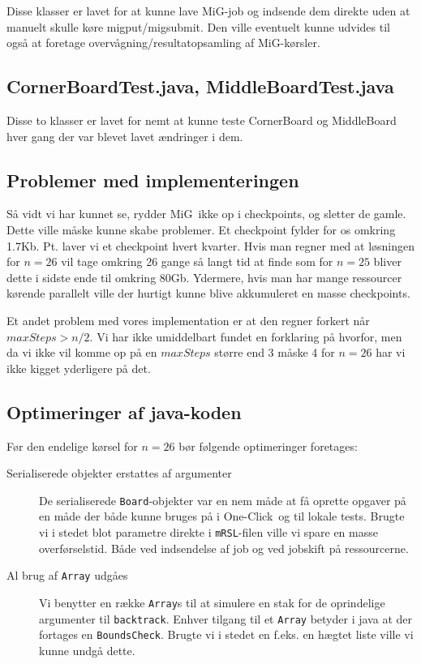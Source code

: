 \documentclass[final,a4paper,11pt]{article}
\newcommand{\mig}{MiG}
\newcommand{\oc}{One-Click}
\begin{document}
Disse klasser er lavet for at kunne lave \mig-job og indsende dem direkte uden
at manuelt skulle køre migput/migsubmit. Den ville eventuelt kunne udvides til
også at foretage overvågning/resultatopsamling af \mig-kørsler.

\subsection{CornerBoardTest.java, MiddleBoardTest.java}

Disse to klasser er lavet for nemt at kunne teste CornerBoard og MiddleBoard
hver gang der var blevet lavet ændringer i dem. 

\subsection{Problemer med implementeringen}

Så vidt vi har kunnet se, rydder \mig\ ikke op i checkpoints, og sletter de
gamle. Dette ville måske kunne skabe problemer. Et checkpoint fylder for os omkring
1.7Kb. Pt. laver vi et checkpoint hvert kvarter. Hvis man regner med at
løsningen for $n=26$ vil tage omkring 26 gange så langt tid at finde som for $n=25$
bliver dette i sidste ende til omkring 80Gb. Ydermere, hvis man har mange
ressourcer kørende parallelt ville der hurtigt kunne blive akkumuleret en masse
checkpoints. 

Et andet problem med vores implementation er at den regner forkert når
$maxSteps>n/2$. Vi har ikke umiddelbart fundet en forklaring på hvorfor, men da
vi ikke vil komme op på en $maxSteps$ større end 3 måske 4 for $n=26$ har vi
ikke kigget yderligere på det.

\subsection{Optimeringer af java-koden}
Før den endelige kørsel for $n=26$ bør følgende optimeringer foretages:

\begin{description}
	\item[Serialiserede objekter erstattes af argumenter]
	De serialiserede \texttt{Board}-objekter var en nem måde at få oprette opgaver på en måde der både kunne bruges på i \oc\ og til lokale tests. Brugte vi i stedet blot parametre direkte i \texttt{mRSL}-filen ville vi spare en masse overførselstid. Både ved indsendelse af job og ved jobskift på ressourcerne.  
	\item[Al brug af \texttt{Array} udgåes]
	Vi benytter en række \texttt{Array}s til at simulere en stak for de oprindelige argumenter til \texttt{backtrack}. Enhver tilgang til et \texttt{Array} betyder i java at der fortages en \texttt{BoundsCheck}. Brugte vi i stedet en f.eks. en hægtet liste ville vi kunne undgå dette.
	 
\end{description}
\end{document}
